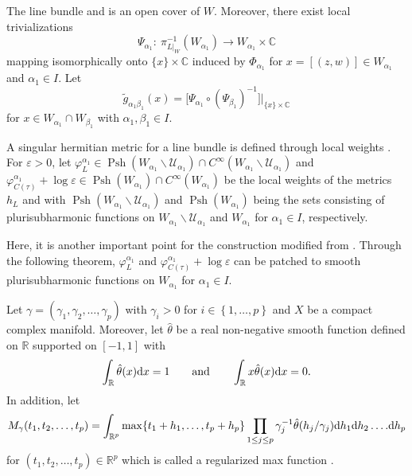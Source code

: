 \documentclass[pdftex]{sigma}
\numberwithin{equation}{section}
\begin{document}
The line bundle  and  is an open cover of $W$. Moreover, there exist local trivializations
\[
\Psi_{\alpha_1}\colon \ \pi^{-1}_{L|_W}(W_{\alpha_1})\rightarrow W_{\alpha_1} \times \mathbb{C}
\]
 mapping  isomorphically onto $\{ x \} \times \mathbb{C}$ induced by $\Phi_{\alpha_1}$ for $x=[(z,w)] \in W_{\alpha_1}$ and $\alpha_1 \in I$. Let
\[
\widetilde{g}_{\alpha_1 \beta_1}(x)=\big[\Psi_{\alpha_1} \circ (\Psi_{\beta_1})^{-1}\big]\big|_{\{ x \}\times \mathbb{C}}
\]
for $x \in W_{\alpha_1} \cap W_{\beta_1}$ with $\alpha_1,\beta_1 \in I$.

A singular hermitian metric for a line bundle is defined through local weights \cite[Definition~8.7]{Vincent-Ahmed}. For $\varepsilon > 0$, let
$
 \varphi^{\alpha_1}_L \in \operatorname{Psh}(W_{\alpha_1} \backslash \mathcal{U}_{\alpha_1})\cap C^\infty(W_{\alpha_1} \backslash \mathcal{U}_{\alpha_1})$ and $\varphi^{\alpha_1} _{C(\tau)}+\log \varepsilon \in \operatorname{Psh}(W_{\alpha_1}) \cap C^\infty (W_{\alpha_1})
$
be the local weights of the metrics $h_L$ and  with $\operatorname{Psh}(W_{\alpha_1} \backslash \mathcal{U}_{\alpha_1})$ and $\operatorname{Psh}(W_{\alpha_1})$ being the sets consisting of plurisubharmonic functions on $W_{\alpha_1} \backslash \mathcal{U}_{\alpha_1}$ and $W_{\alpha_1}$ for $\alpha_1 \in I$, respectively.

Here, it is another important point for the construction modified from \cite{Takayuki-Takato2}. Through the following theorem, $\varphi^{\alpha_1}_L$ and $\varphi^{\alpha_1}_{C(\tau)}+\log \varepsilon$ can be patched to smooth plurisubharmonic functions on $W_{\alpha_1}$ for $\alpha_1 \in I$.

Let $\gamma =(\gamma_1,\gamma_2,\dots ,\gamma_p)$ with $\gamma_i >0$ for $i \in \left \{ 1,\dots ,p\right \}$ and $X$ be a compact complex manifold. Moreover, let $\hat{\theta}$ be a real non-negative smooth function defined on $ \mathbb{R}$ supported on $[-1,1]$ with
\[
\int _\mathbb{R} \hat{\theta}(x){\rm d}x=1 \qquad \text{and} \qquad \int _\mathbb{R}x\hat{\theta} (x){\rm d}x=0.
\]
 In addition, let
\[
M_\gamma (t_1,t_2,\dots ,t_p)=\int _{\mathbb{R}^p}\max \{ t_1+h_1,\dots ,t_p+h_p\}\prod_{1 \leq j \leq p} \gamma^{-1}_j \hat{\theta} (h_j/\gamma_j) {\rm d}h_1 {\rm d}h_2 \dots .{\rm d} h_p
\]
for $(t_1,t_2,\dots ,t_p) \in \mathbb{R}^p$ which is called a regularized max function \cite{Alexandre}.
\end{document}
